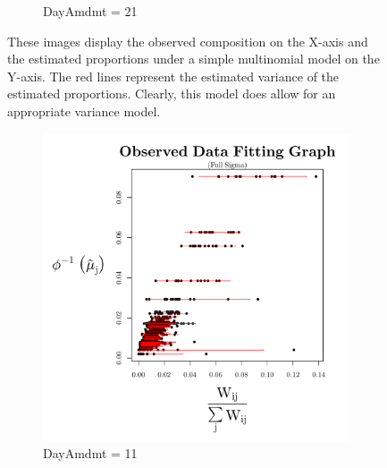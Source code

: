 \documentclass{template}
\begin{document}
\begin{figure}[ht!]
\begin{subfigure}[b]{0.40\textheight}
        \caption{DayAmdmt = 21}
    \end{subfigure}
    \caption{These images display the observed composition on the X-axis and the estimated proportions under a simple multinomial model on the Y-axis. The red lines represent the estimated variance of the estimated proportions. Clearly, this model does allow for an appropriate variance model. }\label{fig:simpMult}
\end{figure}



\clearpage

\begin{figure}[ht!]
    \centering
    \begin{subfigure}[b]{0.40\textheight}
        \includegraphics[width=\textwidth]{Images/XiaPlotBars11.pdf}
        \caption{DayAmdmt = 11}
    \end{subfigure}
\\
    \begin{subfigure}[b]{0.40\textheight}

\end{subfigure}
\end{figure}
\end{document}
